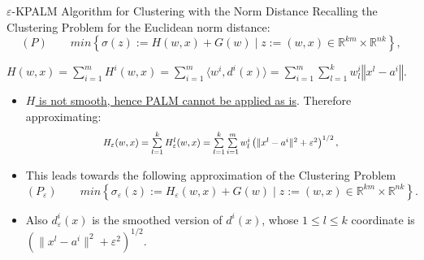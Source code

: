 \documentclass[9pt]{beamer}
\newcommand{\R}{\mathbb{R}} %
\newcommand{\norm}[1]{\left\Vert {#1} \right\Vert} %
\begin{document}
	\begin{frame}{$\varepsilon$-KPALM Algorithm for Clustering with the Norm Distance}
		Recalling the Clustering Problem for the Euclidean norm distance:
		\begin{equation*}
				(P) \qquad min \left\lbrace \sigma(z) := H(w,x) + G(w) \mid z := (w,x) \in \R^{km} \times \R^{nk} \right\rbrace, 
		\end{equation*}
		\begin{center}
		$H(w,x) = \sum\limits_{i=1}^{m} H^i(w,x) = \sum\limits_{i=1}^{m} \langle w^i , d^i(x) \rangle = \sum\limits_{i=1}^m\sum\limits_{l=1}^k w^i_l \norm{x^l - a^i}$.\\
		\end{center}
		\begin{itemize}[<+->]
			\item \underline{$H$ is not smooth, hence PALM cannot be applied as is}. Therefore approximating:
			\begin{equation*}
				\resizebox{.6\hsize}{!}{$H_{\varepsilon}(w,x) = \sum\limits_{l=1}^{k} H^l_{\varepsilon}(w,x)
	= \sum\limits_{l=1}^{k} \sum\limits_{i=1}^{m} w^i_l \left( \| x^l - a^i \|^2 + {\varepsilon}^2 \right)^{1/2},$}
			\end{equation*}
			\item This leads towards the following approximation of the Clustering Problem
			\begin{equation*}
				(P_{\varepsilon}) \qquad min \left\lbrace \sigma_{\varepsilon}(z) := H_{\varepsilon}(w,x) + G(w) \mid z := (w,x) \in \R^{km} \times \R^{nk} \right\rbrace.
			\end{equation*}
			\item Also $d^i_{\varepsilon}(x)$ is the smoothed version of $d^i(x)$, whose $1 \leq l \leq k$ coordinate is $\left( \|x^l - a^i\|^2 + {\varepsilon}^2 \right)^{1/2}$.
		\end{itemize}
	\end{frame}	
	
\end{document}
